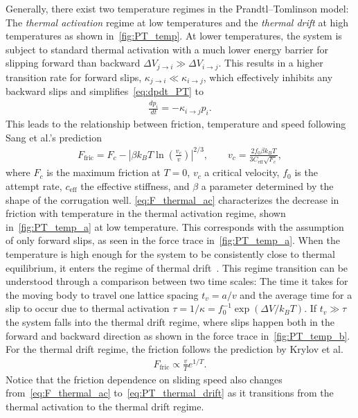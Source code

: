 Generally, there exist two temperature regimes in the Prandtl–Tomlinson model: The \textit{thermal activation} regime at low temperatures and the \textit{thermal drift} at high temperatures as shown in~\cref{fig:PT_temp}. At lower temperatures, the system is subject to standard thermal activation with a much lower energy barrier for slipping forward than backward $\Delta V_{j \to i} \gg \Delta V_{i \to j}$. This results in a higher transition rate for forward slips, $\kappa_{j \to i} \ll \kappa_{i \to j}$, which effectively inhibits any backward slips and simplifies~\cref{eq:dpdt_PT} to
\begin{align*}
  \frac{dp_i}{dt} = -\kappa_{i\to j}p_i.
\end{align*}
This leads to the relationship between friction, temperature and speed following Sang et al.’s prediction~\cite{Sang_2001}
\begin{align}
  F_{\text{fric}} = F_c-\left|\beta k_B T \ln \left(\frac{v_c}{v}\right)\right|^{2 / 3}, \qquad v_c = \frac{2f_0\beta k_B T}{3 C_{\text{eff}} \sqrt{F_c}},
  \label{eq:F_thermal_ac}
\end{align}
where $F_c$ is the maximum friction at $T = 0$, $v_c$ a critical velocity, $f_0$
is the attempt rate, $c_{\text{eff}}$ the effective stiffness, and $\beta$ a
parameter determined by the shape of the corrugation well. \cref{eq:F_thermal_ac} characterizes the decrease in friction with temperature
in the thermal activation regime, shown in~\cref{fig:PT_temp_a} at low temperature. This corresponds with the assumption of only forward slips, as seen in the force trace in~\cref{fig:PT_temp_a}. When the temperature is high enough for the system to be consistently close to thermal equilibrium, it enters the regime of thermal drift~\cite{PhysRevE.71.065101}. This regime transition can be understood through a comparison between two time scales: The time it takes for the moving body to travel one lattice spacing
$t_v = a/v$ and the average time for a slip to occur due to thermal activation
$\tau = 1/\kappa = f_0^{-1}\exp(\Delta V / k_BT)$. If $t_v \gg \tau$ the system falls into the thermal drift regime, where slips happen both in the forward and backward direction as shown in the force trace in~\cref{fig:PT_temp_b}. For the thermal drift regime, the friction follows the prediction by Krylov et
al.~\cite{Krylow_2007, PhysRevE.71.065101, Jinesh_2008}
\begin{align}
  F_{\text{fric}} \propto \frac{v}{T}e^{1/T}.
  \label{eq:PT_thermal_drift}
\end{align}
Notice that the friction dependence on sliding speed also changes from~\cref{eq:F_thermal_ac} to~\cref{eq:PT_thermal_drift} as it transitions from the thermal activation to the thermal drift regime. 


